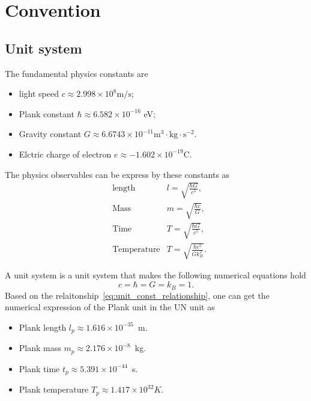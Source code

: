 \section{Convention}


\subsection{Unit system}
The fundamental physics constants are
\begin{itemize}
\item light speed $c\approx 2.998\times 10^8\text{m}/\text{s}$;
\item Plank constant $\hbar \approx 6.582\times 10^{-16}$ eV;
\item Gravity constant $G\approx 6.6743\times 10^{-11}\text{m}^3\cdot\text{kg}\cdot\text{s}^{-2}$.
\item Elctric charge of electron $e\approx -1.602\times 10^{-19}\text{C}$.
\end{itemize}

The physics observables can be express by these constants as
\begin{equation}
\begin{aligned}
&\text{length}& l = \sqrt{\frac{\hbar G}{c^3}},\\
&\text{Mass} & m = \sqrt{\frac{\hbar c}{G}},\\
&\text{Time} &T = \sqrt{\frac{\hbar G}{c^5}},\\
&\text{Temperature} &T=\sqrt{\frac{\hbar c^5}{Gk_B^2}}.
\end{aligned}\label{eq:unit_const_relationship}
\end{equation}

A  unit system is a unit system that makes the following numerical equations hold
\begin{equation}
c=\hbar=G=k_B=1.
\end{equation}
Based on the relaitonship~\ref{eq:unit_const_relationship}, one can get the numerical expression of the Plank unit in the UN unit as
\begin{itemize}
\item Plank length $l_p\approx1.616\times 10^{-35}$~m.
\item Plank mass $m_p\approx2.176\times 10^{-8}$~kg.
\item Plank time $t_p\approx5.391\times 10^{-44}$~s.
\item Plank temperature $T_p\approx 1.417\times 10^{32}K$.
\end{itemize}

